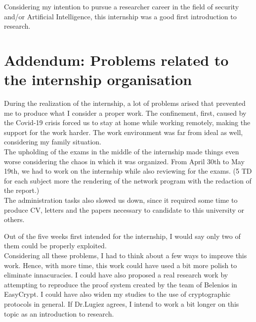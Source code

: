 \documentclass[12pt, a4paper]{report}
\begin{document}
Considering my intention to pursue a researcher career in the field of security and/or Artificial Intelligence, this internship was a good first introduction to research.

\section{Addendum: Problems related to the internship organisation}

During the realization of the internship, a lot of problems arised that prevented me to produce what I consider a proper work. The confinement, first, caused by the Covid-19 crisis forced us to stay at home while working remotely, making the support for the work harder. The work environment was far from ideal as well, considering my family situation.\\ 

The upholding of the exams in the middle of the internship made things even worse considering the chaos in which it was organized. From April 30th to May 19th, we had to work on the internship while also reviewing for the exams. (5 TD for each subject more the rendering of the network program with the redaction of the report.)\\

The administration tasks also slowed us down, since it required some time to produce CV, letters and the papers necessary to candidate to this university or others.

Out of the five weeks first intended for the internship, I would say only two of them could be properly exploited.\\

Considering all these problems, I had to think about a few ways to improve this work. Hence, with more time, this work could have used a bit more polish to eliminate innacuracies. I could have also proposed a real research work by attempting to reproduce the proof system created by the team of Belenios in EasyCrypt. I could have also widen my studies to the use of cryptographic protocols in general. If Dr.Lugiez agrees, I intend to work a bit longer on this topic as an introduction to research.
 



\end{document}
